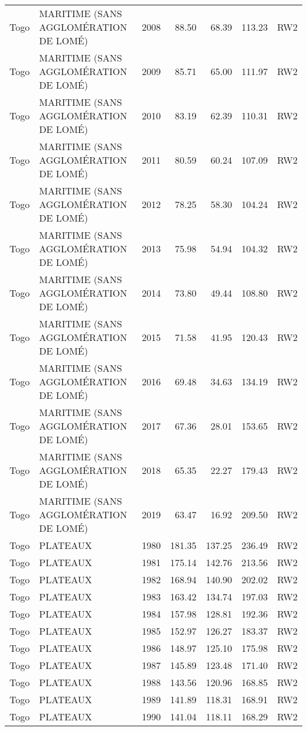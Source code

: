 \begin{longtable}{lllrrrl}
  Togo & MARITIME (SANS AGGLOMÉRATION DE LOMÉ) & 2008 & 88.50 & 68.39 & 113.23 & RW2 \\ 
  Togo & MARITIME (SANS AGGLOMÉRATION DE LOMÉ) & 2009 & 85.71 & 65.00 & 111.97 & RW2 \\ 
  Togo & MARITIME (SANS AGGLOMÉRATION DE LOMÉ) & 2010 & 83.19 & 62.39 & 110.31 & RW2 \\ 
  Togo & MARITIME (SANS AGGLOMÉRATION DE LOMÉ) & 2011 & 80.59 & 60.24 & 107.09 & RW2 \\ 
  Togo & MARITIME (SANS AGGLOMÉRATION DE LOMÉ) & 2012 & 78.25 & 58.30 & 104.24 & RW2 \\ 
  Togo & MARITIME (SANS AGGLOMÉRATION DE LOMÉ) & 2013 & 75.98 & 54.94 & 104.32 & RW2 \\ 
  Togo & MARITIME (SANS AGGLOMÉRATION DE LOMÉ) & 2014 & 73.80 & 49.44 & 108.80 & RW2 \\ 
  Togo & MARITIME (SANS AGGLOMÉRATION DE LOMÉ) & 2015 & 71.58 & 41.95 & 120.43 & RW2 \\ 
  Togo & MARITIME (SANS AGGLOMÉRATION DE LOMÉ) & 2016 & 69.48 & 34.63 & 134.19 & RW2 \\ 
  Togo & MARITIME (SANS AGGLOMÉRATION DE LOMÉ) & 2017 & 67.36 & 28.01 & 153.65 & RW2 \\ 
  Togo & MARITIME (SANS AGGLOMÉRATION DE LOMÉ) & 2018 & 65.35 & 22.27 & 179.43 & RW2 \\ 
  Togo & MARITIME (SANS AGGLOMÉRATION DE LOMÉ) & 2019 & 63.47 & 16.92 & 209.50 & RW2 \\ 
  Togo & PLATEAUX & 1980 & 181.35 & 137.25 & 236.49 & RW2 \\ 
  Togo & PLATEAUX & 1981 & 175.14 & 142.76 & 213.56 & RW2 \\ 
  Togo & PLATEAUX & 1982 & 168.94 & 140.90 & 202.02 & RW2 \\ 
  Togo & PLATEAUX & 1983 & 163.42 & 134.74 & 197.03 & RW2 \\ 
  Togo & PLATEAUX & 1984 & 157.98 & 128.81 & 192.36 & RW2 \\ 
  Togo & PLATEAUX & 1985 & 152.97 & 126.27 & 183.37 & RW2 \\ 
  Togo & PLATEAUX & 1986 & 148.97 & 125.10 & 175.98 & RW2 \\ 
  Togo & PLATEAUX & 1987 & 145.89 & 123.48 & 171.40 & RW2 \\ 
  Togo & PLATEAUX & 1988 & 143.56 & 120.96 & 168.85 & RW2 \\ 
  Togo & PLATEAUX & 1989 & 141.89 & 118.31 & 168.91 & RW2 \\ 
  Togo & PLATEAUX & 1990 & 141.04 & 118.11 & 168.29 & RW2 \\ 

\end{longtable}
